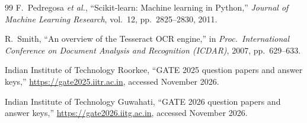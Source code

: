 \begin{thebibliography}{99}
 F.~Pedregosa \emph{et al.}, ``Scikit-learn: Machine learning in Python,'' \emph{Journal of
Machine Learning Research}, vol.~12, pp.~2825--2830, 2011.

 R.~Smith, ``An overview of the Tesseract OCR engine,'' in \emph{Proc.\ International Conference on
Document Analysis and Recognition (ICDAR)}, 2007, pp.~629--633.

 Indian Institute of Technology Roorkee, ``GATE 2025 question papers and answer keys,''
\url{https://gate2025.iitr.ac.in}, accessed November 2026.

 Indian Institute of Technology Guwahati, ``GATE 2026 question papers and answer keys,''
\url{https://gate2026.iitg.ac.in}, accessed November 2026.

\end{thebibliography}
